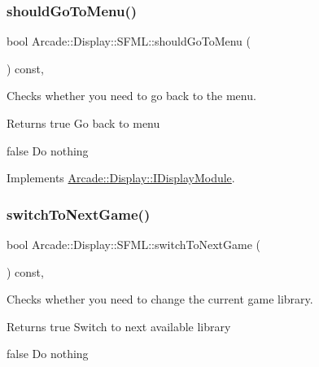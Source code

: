 \mbox{\label{classArcade_1_1Display_1_1SFML_a3072fbe4dd92685154da10cbd602bc3b}} 
\subsubsection{\texorpdfstring{shouldGoToMenu()}{shouldGoToMenu()}}
{\footnotesize\ttfamily bool Arcade\+::\+Display\+::\+S\+F\+M\+L\+::should\+Go\+To\+Menu (\begin{DoxyParamCaption}{ }\end{DoxyParamCaption}) const\hspace{0.3cm}{\ttfamily [final]}, {\ttfamily [virtual]}}



Checks whether you need to go back to the menu. 

\begin{DoxyReturn}{Returns}
true Go back to menu 

false Do nothing 
\end{DoxyReturn}


Implements \mbox{\hyperlink{classArcade_1_1Display_1_1IDisplayModule_ad060f6b99f2adffaf02a4226fc40d0ab}{Arcade\+::\+Display\+::\+I\+Display\+Module}}.

\mbox{\label{classArcade_1_1Display_1_1SFML_af47adddb8c2f26b5ee0109abce03e27a}} 
\subsubsection{\texorpdfstring{switchToNextGame()}{switchToNextGame()}}
{\footnotesize\ttfamily bool Arcade\+::\+Display\+::\+S\+F\+M\+L\+::switch\+To\+Next\+Game (\begin{DoxyParamCaption}{ }\end{DoxyParamCaption}) const\hspace{0.3cm}{\ttfamily [final]}, {\ttfamily [virtual]}}



Checks whether you need to change the current game library. 

\begin{DoxyReturn}{Returns}
true Switch to next available library 

false Do nothing 
\end{DoxyReturn}


